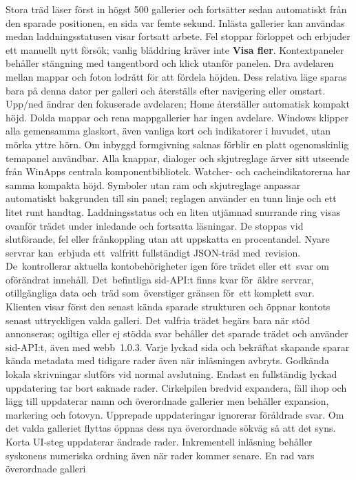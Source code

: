 \documentclass[11pt,a4paper]{article}
\newcommand{\ui}[1]{\textbf{#1}}
\begin{document}
Stora träd läser först in högst 500 gallerier och fortsätter sedan automatiskt
från den sparade positionen, en sida var femte sekund. Inlästa gallerier kan
användas medan laddningsstatusen visar fortsatt arbete. Fel stoppar förloppet
och erbjuder ett manuellt nytt försök; vanlig bläddring kräver inte \ui{Visa fler}.
Kontextpaneler behåller stängning med tangentbord och klick
utanför panelen. Dra avdelaren mellan mappar och foton lodrätt för att fördela
höjden. Dess relativa läge sparas bara på denna dator per galleri och återställs
efter navigering eller omstart. Upp/ned ändrar den fokuserade avdelaren;
Home återställer automatisk kompakt höjd. Dolda mappar och rena mappgallerier
har ingen avdelare. Windows klipper alla gemensamma glaskort, även vanliga kort
och indikatorer i huvudet, utan mörka yttre hörn.
Om inbyggd formgivning saknas förblir en platt ogenomskinlig temapanel användbar.
Alla knappar, dialoger och skjutreglage ärver sitt utseende från WinApps centrala
komponentbibliotek.
Watcher- och cacheindikatorerna har samma kompakta höjd. Symboler utan ram och
skjutreglage anpassar automatiskt bakgrunden till sin panel; reglagen använder
en tunn linje och ett litet runt handtag.
Laddningsstatus och en liten utjämnad snurrande ring visas ovanför trädet under
inledande och fortsatta läsningar. De stoppas vid slutförande, fel eller
frånkoppling utan att uppskatta en procentandel.
Nyare servrar kan~erbjuda ett~valfritt fullständigt JSON-träd med~revision.
De~kontrollerar aktuella kontobehörigheter igen före trädet eller ett~svar om
oförändrat innehåll. Det~befintliga sid-API:t finns kvar för~äldre servrar,
otillgängliga data och~träd som~överstiger gränsen för~ett komplett svar.
Klienten visar först den senast kända sparade strukturen och öppnar
kontots senast uttryckligen valda galleri. Det valfria trädet begärs bara när
stöd annonseras; ogiltiga eller ej stödda svar behåller det sparade trädet och
använder sid-API:t, även med webb~1.0.3. Varje lyckad sida och bekräftat skapande
sparar kända metadata med tidigare rader även när inläsningen avbryts. Godkända
lokala skrivningar slutförs vid normal avslutning. Endast en fullständig lyckad
uppdatering tar bort saknade rader. Cirkelpilen bredvid expandera, fäll ihop och
lägg till uppdaterar namn och överordnade gallerier men behåller expansion,
markering och fotovyn. Upprepade uppdateringar ignorerar föråldrade svar.
Om det valda galleriet flyttas öppnas dess nya överordnade sökväg så att det syns.
Korta UI-steg uppdaterar ändrade rader. Inkrementell inläsning behåller syskonens
numeriska ordning även när rader kommer senare. En rad vars överordnade galleri
\end{document}
